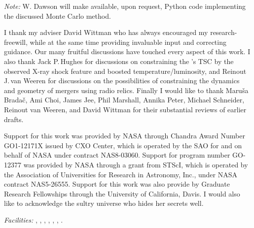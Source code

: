 \documentclass[12pt]{emulateapj}
\begin{document}


\emph{Note:} W. Dawson will make available, upon request, Python code implementing the discussed Monte Carlo method.

\acknowledgments

I thank my adviser David Wittman who has always encouraged my research-freewill, while at the same time providing invaluable input and correcting guidance.
Our many fruitful discussions have touched every aspect of this work.
I also thank Jack P.\,Hughes for discussions on constraining the 's TSC by the observed X-ray shock feature and boosted temperature/luminosity, and
Reinout J.\,van Weeren for discussions on the possibilities of constraining the dynamics and geometry of mergers using radio relics.
Finally I would like to thank Maru{\v s}a Brada{\v c}, Ami Choi, James Jee, Phil Marshall, Annika Peter, Michael Schneider, Reinout van Weeren, and David Wittman for their substantial reviews of earlier drafts.

Support for this work was provided by NASA through Chandra Award Number GO1-12171X issued by CXO Center, which is operated by the SAO for and on behalf of NASA under contract NAS8-03060.  Support for program number GO-12377 was provided by NASA through a grant from STScI, which is operated by the Association of Universities for Research in Astronomy, Inc., under NASA contract NAS5-26555.
Support for this work was also provide by Graduate Research Fellowships through the University of California, Davis.
I would also like to acknowledge the sultry universe who hides her secrets well.


{\it Facilities:} , , , , , , .

\end{document}
